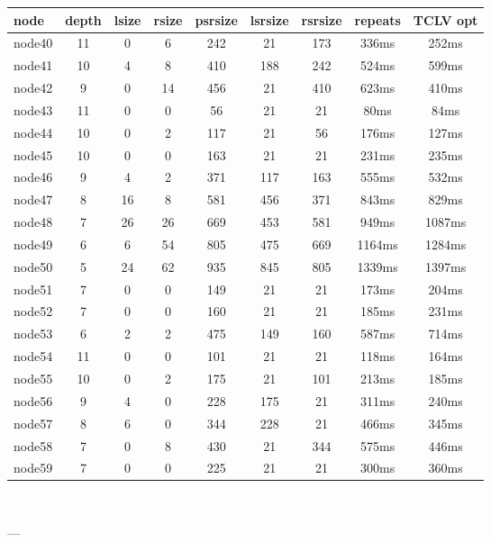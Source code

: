 \begin{tabular}{|l|c|c|c|c|c|c|c|c|}
\hline node & depth & lsize & rsize & psrsize & lsrsize & rsrsize   & repeats & TCLV opt\\
    \hline node40 & 11 & 0 & 6 & 242 & 21 & 173 & 336ms & 252ms\\
    \hline node41 & 10 & 4 & 8 & 410 & 188 & 242 & 524ms & 599ms\\
    \hline node42 & 9 & 0 & 14 & 456 & 21 & 410 & 623ms & 410ms\\
    \hline node43 & 11 & 0 & 0 & 56 & 21 & 21 & 80ms & 84ms\\
    \hline node44 & 10 & 0 & 2 & 117 & 21 & 56 & 176ms & 127ms\\
    \hline node45 & 10 & 0 & 0 & 163 & 21 & 21 & 231ms & 235ms\\
    \hline node46 & 9 & 4 & 2 & 371 & 117 & 163 & 555ms & 532ms\\
    \hline node47 & 8 & 16 & 8 & 581 & 456 & 371 & 843ms & 829ms\\
    \hline node48 & 7 & 26 & 26 & 669 & 453 & 581 & 949ms & 1087ms\\
    \hline node49 & 6 & 6 & 54 & 805 & 475 & 669 & 1164ms & 1284ms\\
    \hline node50 & 5 & 24 & 62 & 935 & 845 & 805 & 1339ms & 1397ms\\
    \hline node51 & 7 & 0 & 0 & 149 & 21 & 21 & 173ms & 204ms\\
    \hline node52 & 7 & 0 & 0 & 160 & 21 & 21 & 185ms & 231ms\\
    \hline node53 & 6 & 2 & 2 & 475 & 149 & 160 & 587ms & 714ms\\
    \hline node54 & 11 & 0 & 0 & 101 & 21 & 21 & 118ms & 164ms\\
    \hline node55 & 10 & 0 & 2 & 175 & 21 & 101 & 213ms & 185ms\\
    \hline node56 & 9 & 4 & 0 & 228 & 175 & 21 & 311ms & 240ms\\
    \hline node57 & 8 & 6 & 0 & 344 & 228 & 21 & 466ms & 345ms\\
    \hline node58 & 7 & 0 & 8 & 430 & 21 & 344 & 575ms & 446ms\\
    \hline node59 & 7 & 0 & 0 & 225 & 21 & 21 & 300ms & 360ms\\

\hline
\end{tabular} \

---


